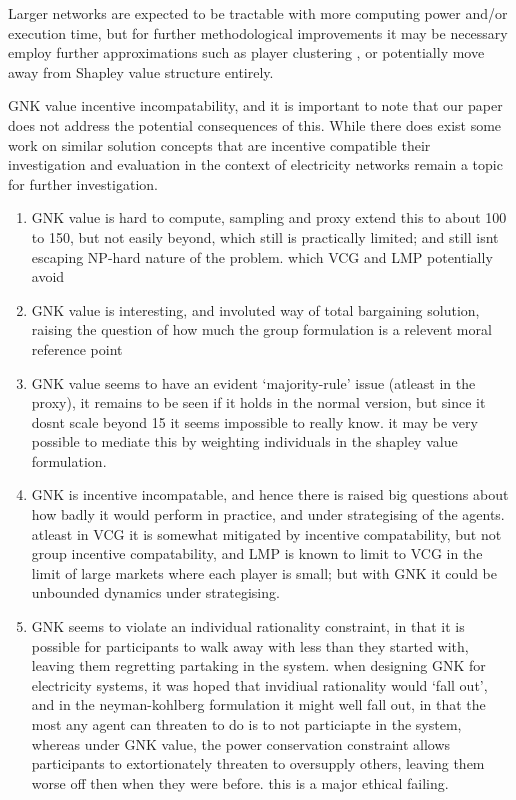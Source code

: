 Larger networks are expected to be tractable with more computing power and/or execution time, but for further methodological improvements it may be necessary employ further approximations such as player clustering \cite{DBLP:journals/corr/abs-1903-10965}, or potentially move away from Shapley value structure entirely.

GNK value incentive incompatability, and it is important to note that our paper does not address the potential consequences of this.
While there does exist some work on similar solution concepts that are incentive compatible \cite{myerson1,Salamanca2019} their investigation and evaluation in the context of electricity networks remain a topic for further investigation.



\begin{enumerate}
\item	GNK value is hard to compute, sampling and proxy extend this to about 100 to 150, but not easily beyond, which still is practically limited; and still isnt escaping NP-hard nature of the problem. which VCG and LMP potentially avoid
\item	GNK value is interesting, and involuted way of total bargaining solution, raising the question of how much the group formulation is a relevent moral reference point
\item	GNK value seems to have an evident `majority-rule' issue (atleast in the proxy), it remains to be seen if it holds in the normal version, but since it dosnt scale beyond 15 it seems impossible to really know. it may be very possible to mediate this by weighting individuals in the shapley value formulation.
\item	GNK is incentive incompatable, and hence there is raised big questions about how badly it would perform in practice, and under strategising of the agents. atleast in VCG it is somewhat mitigated by incentive compatability, but not group incentive compatability, and LMP is known to limit to VCG in the limit of large markets where each player is small; but with GNK it could be unbounded dynamics under strategising.
\item	GNK seems to violate an individual rationality constraint, in that it is possible for participants to walk away with less than they started with, leaving them regretting partaking in the system. when designing GNK for electricity systems, it was hoped that invidiual rationality would `fall out', and in the neyman-kohlberg formulation it might well fall out, in that the most any agent can threaten to do is to not particiapte in the system, whereas under GNK value, the power conservation constraint allows participants to extortionately threaten to oversupply others, leaving them worse off then when they were before. this is a major ethical failing.
\end{enumerate}

